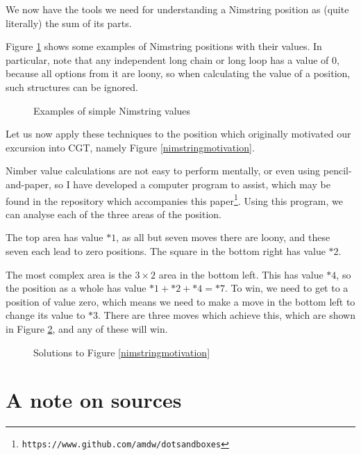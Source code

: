 \documentclass[a4paper,twocolumn]{article}
\begin{document}
We now have the tools we need for understanding a Nimstring position
as (quite literally) the sum of its parts.

Figure \ref{nimstringexamples} shows some examples of Nimstring
positions with their values. In particular, note that any independent
long chain or long loop has a value of $0$, because all options from
it are loony, so when calculating the value of a position, such
structures can be ignored.

\begin{figure}
  \centering
  \def\svgscale{0.7}
  
  \caption{Examples of simple Nimstring values}
  \label{nimstringexamples}
\end{figure}

Let us now apply these techniques to the position which originally
motivated our excursion into CGT, namely Figure
\ref{nimstringmotivation}.

Nimber value calculations are not easy to perform mentally, or even
using pencil-and-paper, so I have developed a computer program to
assist, which may be found in the repository which accompanies this
paper\footnote{\texttt{https://www.github.com/amdw/dotsandboxes}}. Using
this program, we can analyse each of the three areas of the position.

The top area has value $*1$, as all but seven moves there are loony,
and these seven each lead to zero positions. The square in the bottom
right has value $*2$.

The most complex area is the $3 \times 2$ area in the bottom
left. This has value $*4$, so the position as a whole has value $*1 +
*2 + *4 = *7$. To win, we need to get to a position of value zero,
which means we need to make a move in the bottom left to change its
value to $*3$. There are three moves which achieve this, which are
shown in Figure \ref{nimstringmotivationsolution}, and any of these
will win.

\begin{figure}
  \centering
  \def\svgscale{0.7}
  
  \caption{Solutions to Figure \ref{nimstringmotivation}}
  \label{nimstringmotivationsolution}
\end{figure}

\appendix

\section{A note on sources}
\end{document}
